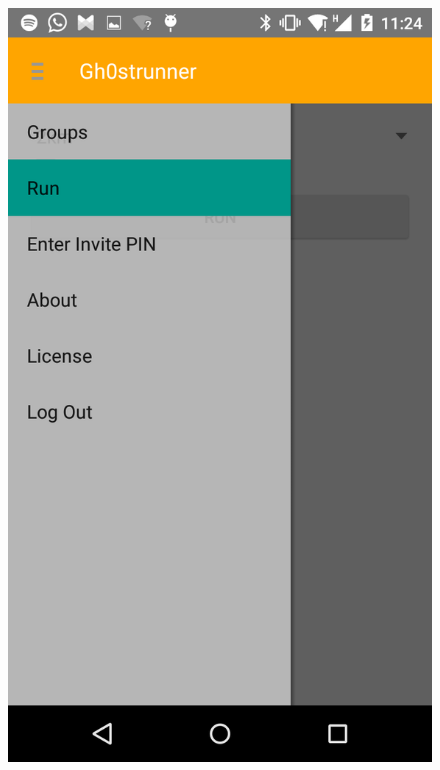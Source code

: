 \begin{figure}[!h]
\centering
\begin{minipage}{.4\textwidth}
  \centering
  \includegraphics[width=.8\linewidth]{abb/bsp/bsp7}
  \label{fig:bsp7}
\end{minipage}
\begin{minipage}{.4\textwidth}
  \centering

\end{minipage}
\end{figure}
